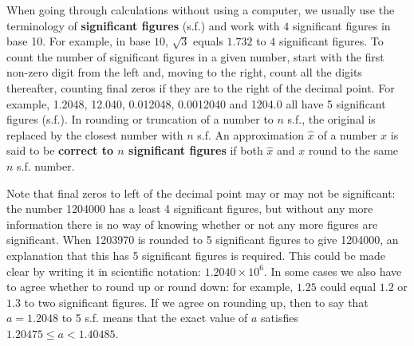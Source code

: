 \documentclass[11pt,a4paper]{memoir}
\begin{document}
When going through calculations without using a computer, we usually use the terminology 
of \textbf{significant figures} (s.f.) and work with $4$ significant figures in base 10. 
For example, in base $10$, $\sqrt{3}$ equals $1.732$ to $4$ significant figures. 
To count the number of significant figures in a given number, start with the first
non-zero digit from the left and, moving to the right, count all the
digits thereafter, counting final zeros if they are to the right of
the decimal point. For example, 1.2048, 12.040, 0.012048, 0.0012040
and 1204.0 all have 5 significant figures (s.f.). In rounding or truncation
of a number to $n$ s.f., the original is replaced by the closest number with $n$ s.f.
An approximation $\hat{x}$ of a number $x$ is said to be \textbf{correct to $n$ significant figures} if both $\hat{x}$ and $x$ round to the same $n$ s.f. number.

\begin{remark}
Note that final zeros to left of the decimal point may or may not be
significant: the number 1204000 has a least 4 significant figures, but
without any more information there is no way of knowing whether or not
any more figures are significant. When 1203970 is rounded to 5
significant figures to give 1204000, an explanation that this has 5
significant figures is required. This could be made clear by writing it
in scientific notation: $1.2040\times 10^6$. In some cases we also have to agree whether to round
up or round down: for example, $1.25$ could equal $1.2$ or $1.3$ to two significant figures.
If we agree on rounding up, then to say that $a=1.2048$ to 5 s.f. means that the exact
value of $a$ satisfies $1.20475\le a< 1.40485$.
\end{remark}
\end{document}

